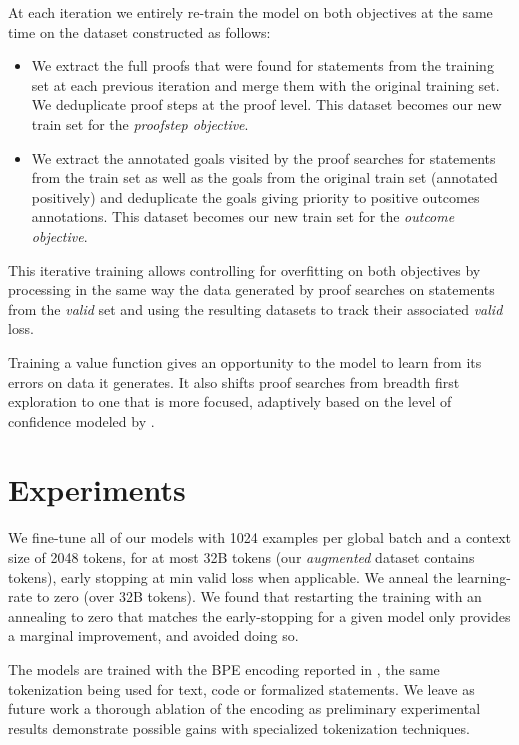 \documentclass{article}
\begin{document}
At each iteration we entirely re-train the model on both objectives at the same time on the dataset constructed as follows:

\begin{itemize}
    \item  We extract the full proofs that were found for statements from the training set at each previous iteration and merge them with the original training set. We deduplicate proof steps at the proof level. This dataset becomes our new train set for the \textit{proofstep objective}.
    \item We extract the annotated goals visited by the proof searches for statements from the train set as well as the goals from the original train set (annotated positively) and deduplicate the goals giving priority to positive outcomes annotations. This dataset becomes our new train set for the \textit{outcome objective}.
\end{itemize}

This iterative training allows controlling for overfitting on both objectives by processing in the same way the data generated by proof searches on statements from the \textit{valid} set and using the resulting datasets to track their associated \textit{valid} loss.

Training a value function gives an opportunity to the model to learn from its errors on data it generates. It also shifts proof searches from breadth first exploration to one that is more focused, adaptively based on the level of confidence modeled by .

\section{Experiments}
\label{section:experiments}

We fine-tune all of our models with 1024 examples per global batch and a context size of 2048 tokens, for at most 32B tokens (our \textit{augmented} dataset contains  tokens), early stopping at min valid loss when applicable. We anneal the learning-rate to zero (over 32B tokens). We found that restarting the training with an annealing to zero that matches the early-stopping for a given model only provides a marginal improvement, and avoided doing so.

The models are trained with the BPE encoding reported in \cite{brown2020language}, the same tokenization being used for text, code or formalized statements. We leave as future work a thorough ablation of the encoding as preliminary experimental results demonstrate possible gains with specialized tokenization techniques. 
\end{document}
